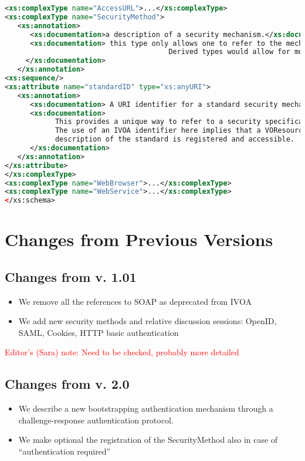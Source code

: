 \documentclass[11pt,a4paper]{ivoa}
\begin{document}
\begin{lstlisting}[language=xml,basicstyle=\footnotesize]
<xs:complexType name="AccessURL">...</xs:complexType>
<xs:complexType name="SecurityMethod">
   <xs:annotation>
      <xs:documentation>a description of a security mechanism.</xs:documentation>
      <xs:documentation> this type only allows one to refer to the mechanism via a URI.
                                       Derived types would allow for more metadata.
     </xs:documentation>
   </xs:annotation>
<xs:sequence/>
<xs:attribute name="standardID" type="xs:anyURI">
   <xs:annotation>
      <xs:documentation> A URI identifier for a standard security mechanism. </xs:documentation>
      <xs:documentation>
            This provides a unique way to refer to a security specification standard.
            The use of an IVOA identifier here implies that a VOResource
            description of the standard is registered and accessible.
      </xs:documentation>
   </xs:annotation>
</xs:attribute>
</xs:complexType>
<xs:complexType name="WebBrowser">...</xs:complexType>
<xs:complexType name="WebService">...</xs:complexType>
</xs:schema>
\end{lstlisting}


\section{Changes from Previous Versions}

\subsection {Changes from v. 1.01}
\begin{itemize}
\item We remove all the references to SOAP as deprecated from IVOA
\item We add new security methods and relative discussion sessions: 
	OpenID, SAML, Cookies, HTTP basic authentication
\end{itemize}

\textcolor{red}{Editor's (Sara) note: Need to be checked, probably more
detailed}

\subsection {Changes from v. 2.0}
\begin{itemize}
\item We describe a new bootstrapping authentication mechanism through
	a challenge-response authentication protocol.
\item We make optional the registration of the SecurityMethod also in 
	case of ``authentication required''
\end{itemize}



\end{document}
